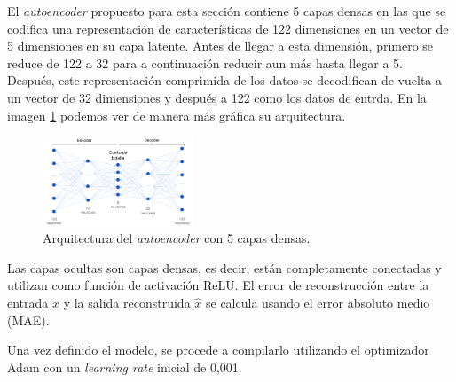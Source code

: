 El \textit{autoencoder} propuesto para esta sección contiene 5 capas densas en las que se codifica una representación de características de 122 dimensiones en un vector de 5 dimensiones en su capa latente. Antes de llegar a esta dimensión, primero se reduce de 122 a 32 para a continuación reducir aun más hasta llegar a 5. Después, este representación comprimida de los datos se decodifican de vuelta a un vector de 32 dimensiones y después a 122 como los datos de entrda. En la imagen \ref{fig:architectureAE} podemos ver de manera más gráfica su arquitectura.

\begin{figure}[H]
    \centering
    \includegraphics[width=0.4\textwidth]{img/kddAE.png} 
    \caption{Arquitectura del \textit{autoencoder} con 5 capas densas.}
    \label{fig:architectureAE}
\end{figure}

Las capas ocultas son capas densas, es decir, están completamente conectadas y utilizan como función de activación ReLU. El error de reconstrucción entre la entrada $x$ y la salida reconstruida $\hat{x}$ se calcula usando el error absoluto medio (MAE).

Una vez definido el modelo, se procede a compilarlo utilizando el optimizador Adam con un \textit{learning rate} inicial de 0,001. 

